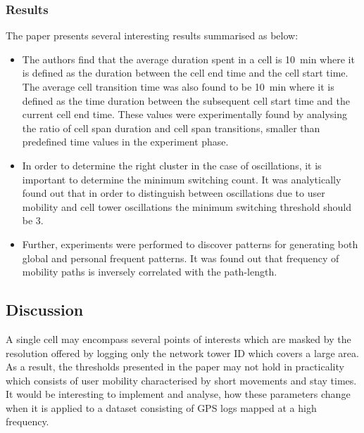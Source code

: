 \subsubsection*{Results}
The paper presents several interesting results summarised as below:

\begin{itemize}

	\item The authors find that the average duration spent in a cell is 10~min where it is 
	defined as the duration between the cell end time and the cell start time. The average
	cell transition time was also found to be 10~min where it is defined as the time duration
	between the subsequent cell start time and the current cell end time. These values were 
	experimentally found by analysing the ratio of cell span duration and cell span transitions,
	smaller than predefined time values in the experiment phase.  
	
	\item In order to determine the right cluster in the case of oscillations, it is important
	to determine the minimum switching count. It was analytically found out that in order to 
	distinguish between oscillations due to user mobility and cell tower oscillations the 
	minimum switching threshold should be 3. 
	
	\item Further, experiments were performed to discover patterns for generating both global
	and personal frequent patterns. It was found out that frequency 	of mobility paths is inversely
	correlated with the path-length. 
	
\end{itemize}

\subsection*{Discussion}
A single cell may encompass several points of interests which are masked by the resolution 
offered by logging only the network tower ID which covers a large area. As a result, the thresholds 
presented in the paper may not hold in practicality which consists of user mobility characterised 
by short movements and stay times. It would be interesting to implement and analyse, how these
parameters change when it is applied to a dataset consisting of GPS logs mapped at a high
frequency. 
